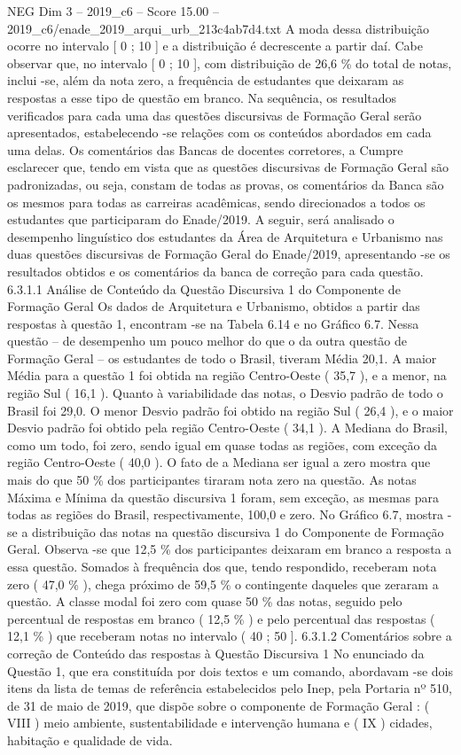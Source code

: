 \begin{textsample}{NEG Dim 3 – 2019\_c6 – Score 15.00 – 2019\_c6/enade\_2019\_arqui\_urb\_213c4ab7d4.txt}
A moda dessa distribuição ocorre no intervalo [ 0 ; 10 ] e a distribuição é decrescente a partir daí.
Cabe observar que, no intervalo [ 0 ; 10 ], com distribuição de 26,6 \% do total de notas, inclui -se, além da nota zero, a frequência de estudantes que deixaram as respostas a esse tipo de questão em branco.
Na sequência, os resultados verificados para cada uma das questões discursivas de Formação Geral serão apresentados, estabelecendo -se relações com os conteúdos abordados em cada uma delas.
Os comentários das Bancas de docentes corretores, a Cumpre esclarecer que, tendo em vista que as questões discursivas de Formação Geral são padronizadas, ou seja, constam de todas as provas, os comentários da Banca são os mesmos para todas as carreiras acadêmicas, sendo direcionados a todos os estudantes que participaram do Enade/2019.
A seguir, será analisado o desempenho linguístico dos estudantes da Área de Arquitetura e Urbanismo nas duas questões discursivas de Formação Geral do Enade/2019, apresentando -se os resultados obtidos e os comentários da banca de correção para cada questão. 6.3.1.1 Análise de Conteúdo da Questão Discursiva 1 do Componente de Formação Geral Os dados de Arquitetura e Urbanismo, obtidos a partir das respostas à questão 1, encontram -se na Tabela 6.14 e no Gráfico 6.7.
Nessa questão – de desempenho um pouco melhor do que o da outra questão de Formação Geral – os estudantes de todo o Brasil, tiveram Média 20,1.
A maior Média para a questão 1 foi obtida na região Centro-Oeste ( 35,7 ), e a menor, na região Sul ( 16,1 ).
Quanto à variabilidade das notas, o Desvio padrão de todo o Brasil foi 29,0.
O menor Desvio padrão foi obtido na região Sul ( 26,4 ), e o maior Desvio padrão foi obtido pela região Centro-Oeste ( 34,1 ).
A Mediana do Brasil, como um todo, foi zero, sendo igual em quase todas as regiões, com exceção da região Centro-Oeste ( 40,0 ).
O fato de a Mediana ser igual a zero mostra que mais do que 50 \% dos participantes tiraram nota zero na questão.
As notas Máxima e Mínima da questão discursiva 1 foram, sem exceção, as mesmas para todas as regiões do Brasil, respectivamente, 100,0 e zero.
No Gráfico 6.7, mostra -se a distribuição das notas na questão discursiva 1 do Componente de Formação Geral.
Observa -se que 12,5 \% dos participantes deixaram em branco a resposta a essa questão.
Somados à frequência dos que, tendo respondido, receberam nota zero ( 47,0 \% ), chega próximo de 59,5 \% o contingente daqueles que zeraram a questão.
A classe modal foi zero com quase 50 \% das notas, seguido pelo percentual de respostas em branco ( 12,5 \% ) e pelo percentual das respostas ( 12,1 \% ) que receberam notas no intervalo ( 40 ; 50 ]. 6.3.1.2 Comentários sobre a correção de Conteúdo das respostas à Questão Discursiva 1 No enunciado da Questão 1, que era constituída por dois textos e um comando, abordavam -se dois itens da lista de temas de referência estabelecidos pelo Inep, pela Portaria nº 510, de 31 de maio de 2019, que dispõe sobre o componente de Formação Geral : ( VIII ) meio ambiente, sustentabilidade e intervenção humana e ( IX ) cidades, habitação e qualidade de vida.

\end{textsample}
